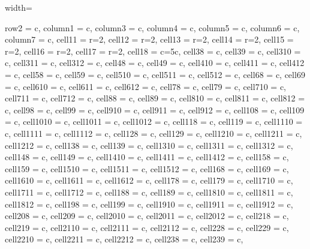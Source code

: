 \documentclass[journal]{IEEEtran}
\begin{document}
\begin{table}
\caption{Test of trained models over the real dataset of 6,145 events.}
\centering
\begin{adjustbox}{width=\textwidth}
\begin{tblr}{
  row{2} = {c}, column{1} = {c}, column{3} = {c},  column{4} = {c},  column{5} = {c},
  column{6} = {c},  column{7} = {c},  cell{1}{1} = {r=2}{},  cell{1}{2} = {r=2}{},
  cell{1}{3} = {r=2}{},  cell{1}{4} = {r=2}{},  cell{1}{5} = {r=2}{},  cell{1}{6} = {r=2}{},
  cell{1}{7} = {r=2}{},  cell{1}{8} = {c=5}{c},  cell{3}{8} = {c},  cell{3}{9} = {c},
  cell{3}{10} = {c},  cell{3}{11} = {c},  cell{3}{12} = {c},  cell{4}{8} = {c},
  cell{4}{9} = {c},  cell{4}{10} = {c},  cell{4}{11} = {c},  cell{4}{12} = {c},
  cell{5}{8} = {c},  cell{5}{9} = {c},  cell{5}{10} = {c},  cell{5}{11} = {c},
  cell{5}{12} = {c},  cell{6}{8} = {c},  cell{6}{9} = {c},  cell{6}{10} = {c},
  cell{6}{11} = {c},  cell{6}{12} = {c},  cell{7}{8} = {c},  cell{7}{9} = {c},
  cell{7}{10} = {c},  cell{7}{11} = {c},  cell{7}{12} = {c},  cell{8}{8} = {c},
  cell{8}{9} = {c},  cell{8}{10} = {c},  cell{8}{11} = {c},  cell{8}{12} = {c},
  cell{9}{8} = {c},  cell{9}{9} = {c},  cell{9}{10} = {c},  cell{9}{11} = {c},
  cell{9}{12} = {c},  cell{10}{8} = {c},  cell{10}{9} = {c},  cell{10}{10} = {c},
  cell{10}{11} = {c},  cell{10}{12} = {c},  cell{11}{8} = {c},  cell{11}{9} = {c},
  cell{11}{10} = {c},  cell{11}{11} = {c},  cell{11}{12} = {c},  cell{12}{8} = {c},
  cell{12}{9} = {c},  cell{12}{10} = {c},  cell{12}{11} = {c},  cell{12}{12} = {c},
  cell{13}{8} = {c},  cell{13}{9} = {c},  cell{13}{10} = {c},  cell{13}{11} = {c},
  cell{13}{12} = {c},  cell{14}{8} = {c},  cell{14}{9} = {c},  cell{14}{10} = {c},
  cell{14}{11} = {c},  cell{14}{12} = {c},  cell{15}{8} = {c},  cell{15}{9} = {c},
  cell{15}{10} = {c},  cell{15}{11} = {c},  cell{15}{12} = {c},  cell{16}{8} = {c},
  cell{16}{9} = {c},  cell{16}{10} = {c},  cell{16}{11} = {c},  cell{16}{12} = {c},
  cell{17}{8} = {c},  cell{17}{9} = {c},  cell{17}{10} = {c},  cell{17}{11} = {c},
  cell{17}{12} = {c},  cell{18}{8} = {c},  cell{18}{9} = {c},  cell{18}{10} = {c},
  cell{18}{11} = {c},  cell{18}{12} = {c},  cell{19}{8} = {c},  cell{19}{9} = {c},
  cell{19}{10} = {c},  cell{19}{11} = {c},  cell{19}{12} = {c},  cell{20}{8} = {c},
  cell{20}{9} = {c},  cell{20}{10} = {c},  cell{20}{11} = {c},  cell{20}{12} = {c},
  cell{21}{8} = {c},  cell{21}{9} = {c},  cell{21}{10} = {c},  cell{21}{11} = {c},
  cell{21}{12} = {c},  cell{22}{8} = {c},  cell{22}{9} = {c},  cell{22}{10} = {c},
  cell{22}{11} = {c},  cell{22}{12} = {c},  cell{23}{8} = {c},  cell{23}{9} = {c},
}
\end{tblr}
\end{adjustbox}
\end{table}
\end{document}

